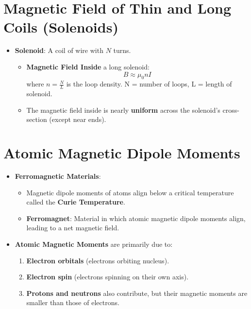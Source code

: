 \documentclass{article}
\begin{document}
\section*{Magnetic Field of Thin and Long Coils (Solenoids)}
\begin{itemize}
    \item \textbf{Solenoid}: A coil of wire with \(N\) turns.
    \begin{itemize}
        \item \textbf{Magnetic Field Inside} a long solenoid:
        \[
        B \approx \mu_0 n I
        \]
        where \(n = \frac{N}{L}\) is the loop density.
        N = number of loops, L = length of solenoid.
        \item The magnetic field inside is nearly \textbf{uniform} across the solenoid's cross-section (except near ends).
    \end{itemize}
\end{itemize}

\section*{Atomic Magnetic Dipole Moments}
\begin{itemize}
    \item \textbf{Ferromagnetic Materials}:
    \begin{itemize}
        \item Magnetic dipole moments of atoms align below a critical temperature called the \textbf{Curie Temperature}.
        \item \textbf{Ferromagnet}: Material in which atomic magnetic dipole moments align, leading to a net magnetic field.
    \end{itemize}
    \item \textbf{Atomic Magnetic Moments} are primarily due to:
    \begin{enumerate}
        \item \textbf{Electron orbitals} (electrons orbiting nucleus).
        \item \textbf{Electron spin} (electrons spinning on their own axis).
        \item \textbf{Protons and neutrons} also contribute, but their magnetic moments are smaller than those of electrons.
    \end{enumerate}
\end{itemize}
\end{document}
